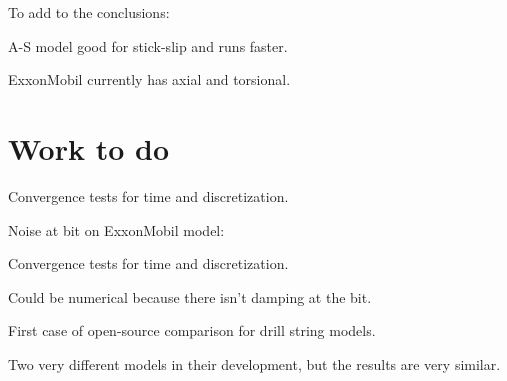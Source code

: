 To add to the conclusions:
\begin{bulletedlist}
	\item A-S model good for stick-slip and runs faster.
	\item ExxonMobil currently has axial and torsional.
\end{bulletedlist}

\section{Work to do}
\begin{bulletedlist}
	\item Convergence tests for time and discretization.
\end{bulletedlist}

Noise at bit on ExxonMobil model:
\begin{bulletedlist}
	\item Convergence tests for time and discretization.
	\item Could be numerical because there isn't damping at the bit.
\end{bulletedlist}

First case of open-source comparison for drill string models. 

Two very different models in their development, but the results are very similar.